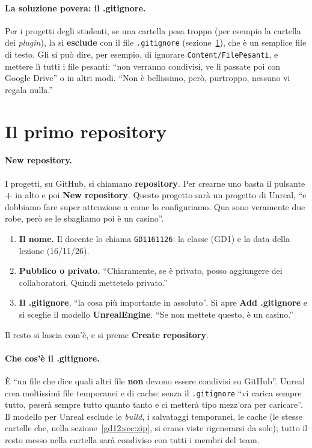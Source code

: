 \paragraph{La soluzione povera: il .gitignore.} Per i progetti degli studenti,
se una cartella pesa troppo (per esempio la cartella dei \emph{plugin}), la si
\textbf{esclude} con il file \texttt{.gitignore} (sezione~\ref{gd13:sec:repository}),
che è un semplice file di testo. Gli si può dire, per esempio, di ignorare
\texttt{Content/FilePesanti}, e mettere lì tutti i file pesanti: ``non verranno
condivisi, ve li passate poi con Google Drive'' o in altri modi. ``Non è
bellissimo, però, purtroppo, nessuno vi regala nulla.''

\section{Il primo repository}
\label{gd13:sec:repository}

\paragraph{New repository.} I progetti, su GitHub, si chiamano
\textbf{repository}. Per crearne uno basta il pulsante \textbf{+} in alto e poi
\textbf{New repository}. Questo progetto sarà un progetto di Unreal, ``e
dobbiamo fare super attenzione a come lo configuriamo. Qua sono veramente due
robe, però se le sbagliamo poi è un casino''.
\begin{enumerate}
  \item \textbf{Il nome.} Il docente lo chiama \texttt{GD1161126}: la classe
        (GD1) e la data della lezione (16/11/26).
  \item \textbf{Pubblico o privato.} ``Chiaramente, se è privato, posso
        aggiungere dei collaboratori. Quindi mettetelo privato.''
  \item \textbf{Il .gitignore}, ``la cosa più importante in assoluto''. Si apre
        \textbf{Add .gitignore} e si sceglie il modello \textbf{UnrealEngine}.
        ``Se non mettete questo, è un casino.''
\end{enumerate}
Il resto si lascia com'è, e si preme \textbf{Create repository}.

\paragraph{Che cos'è il .gitignore.} È ``un file che dice quali altri file
\textbf{non} devono essere condivisi su GitHub''. Unreal crea moltissimi file
temporanei e di cache: senza il \texttt{.gitignore} ``vi carica sempre tutto,
peserà sempre tutto quanto tanto e ci metterà tipo mezz'ora per caricare''. Il
modello per Unreal esclude le \emph{build}, i salvataggi temporanei, le cache
(le stesse cartelle che, nella sezione~\ref{gd12:sec:zip}, si erano viste
rigenerarsi da sole); tutto il resto messo nella cartella sarà condiviso con
tutti i membri del team.

